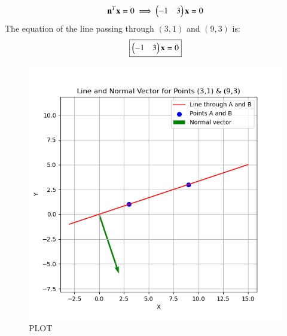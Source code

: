 \documentclass[journal]{IEEEtran}
\begin{document}
\begin{align}
    \mathbf{n}^T \mathbf{x} = 0 \implies \begin{pmatrix}-1 & 3\end{pmatrix} \mathbf{x} = 0 
\end{align}
The equation of the line passing through $(3,1)$ and $(9,3)$ is:
\[\boxed{\begin{pmatrix}-1 & 3\end{pmatrix} \mathbf{x} = 0 }\]
\begin{figure}[H]
    \centering
    \includegraphics[width=0.8\columnwidth]{figs/Figure_1.png}
    \caption{PLOT}
    \label{fig:fig1}
\end{figure}
\end{document}
